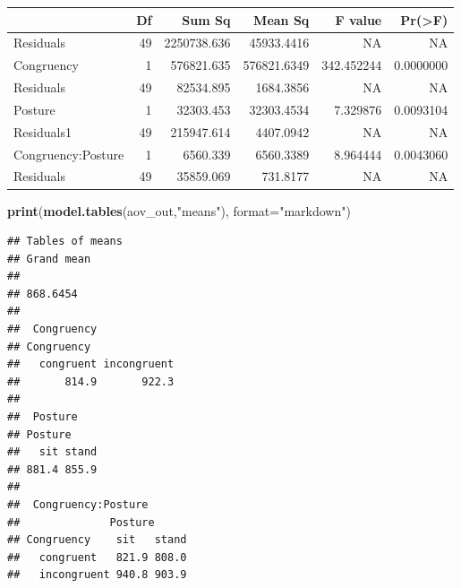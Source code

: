 \documentclass[]{book}
\newenvironment{Shaded}{\begin{snugshade}}{\end{snugshade}}
\newcommand{\KeywordTok}[1]{\textcolor[rgb]{0.13,0.29,0.53}{\textbf{#1}}}
\newcommand{\DataTypeTok}[1]{\textcolor[rgb]{0.13,0.29,0.53}{#1}}
\newcommand{\StringTok}[1]{\textcolor[rgb]{0.31,0.60,0.02}{#1}}
\newcommand{\CommentTok}[1]{\textcolor[rgb]{0.56,0.35,0.01}{\textit{#1}}}
\newcommand{\OperatorTok}[1]{\textcolor[rgb]{0.81,0.36,0.00}{\textbf{#1}}}
\newcommand{\NormalTok}[1]{#1}
\begin{document}
\begin{Shaded}
\end{Shaded}

\begin{tabular}{l|r|r|r|r|r}
\hline
  & Df & Sum Sq & Mean Sq & F value & Pr(>F)\\
\hline
Residuals & 49 & 2250738.636 & 45933.4416 & NA & NA\\
\hline
Congruency & 1 & 576821.635 & 576821.6349 & 342.452244 & 0.0000000\\
\hline
Residuals & 49 & 82534.895 & 1684.3856 & NA & NA\\
\hline
Posture & 1 & 32303.453 & 32303.4534 & 7.329876 & 0.0093104\\
\hline
Residuals1 & 49 & 215947.614 & 4407.0942 & NA & NA\\
\hline
Congruency:Posture & 1 & 6560.339 & 6560.3389 & 8.964444 & 0.0043060\\
\hline
Residuals & 49 & 35859.069 & 731.8177 & NA & NA\\
\hline
\end{tabular}

\begin{Shaded}
\begin{Highlighting}[]
\KeywordTok{print}\NormalTok{(}\KeywordTok{model.tables}\NormalTok{(aov_out,}\StringTok{"means"}\NormalTok{), }\DataTypeTok{format=}\StringTok{"markdown"}\NormalTok{)}
\end{Highlighting}
\end{Shaded}

\begin{verbatim}
## Tables of means
## Grand mean
##          
## 868.6454 
## 
##  Congruency 
## Congruency
##   congruent incongruent 
##       814.9       922.3 
## 
##  Posture 
## Posture
##   sit stand 
## 881.4 855.9 
## 
##  Congruency:Posture 
##              Posture
## Congruency    sit   stand
##   congruent   821.9 808.0
##   incongruent 940.8 903.9
\end{verbatim}
\end{document}
